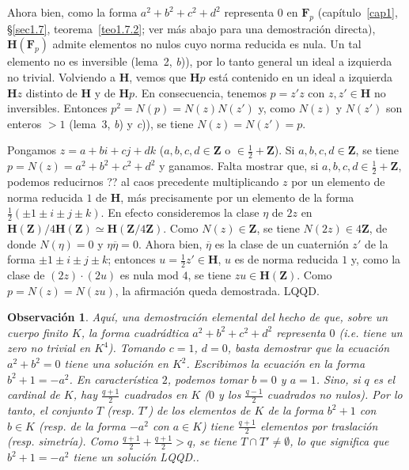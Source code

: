 \documentclass[bibtotoc,leqno,spanish]{amsbook}
\newcommand{\ZZ}{\mathbf{Z}}
\newcommand{\FF}{\mathbf{F}}
\newcommand{\HH}{\mathbf{H}}
\newcommand{\QED}{LQQD.}
\newcommand{\oline}[1]{\overline{#1}}
\numberwithin{equation}{section}
\theoremstyle{note}
\theoremstyle{note}
\theoremstyle{rem}
\newtheorem*{remark*}{Observaci\'on}
\numberwithin{theorem}{section}
\numberwithin{proposition}{section}
\numberwithin{definition}{section}
\numberwithin{lemma}{section}
\numberwithin{corollary}{section}
\numberwithin{example}{section}
\numberwithin{footnote}{section}%
\begin{document}
Ahora bien, como la forma $a^{2}+b^{2}+c^{2}+d^{2}$ representa $0$ en $\FF_{p}$ (cap\'itulo~\ref{cap1},
\S\ref{sec1.7}, teorema~\ref{teo1.7.2};
ver m\'as abajo para una demostraci\'on directa), $\HH(\FF_{p})$ admite elementos
no nulos cuyo norma reducida es nula. Un tal elemento no es inversible (lema~2, {\itshape b})), por lo
tanto general un ideal a izquierda no trivial. Volviendo a $\HH$, vemos que $\HH p$ est\'a
contenido en un ideal a izquierda $\HH z$ distinto de $\HH$ y de $\HH p$. En consecuencia, tenemos
$p = z'z$ con $z,z'\in\HH$ no inversibles. Entonces $p^{2}=N(p)=N(z)N(z')$ y, como
$N(z)$ y $N(z')$ son enteros $>1$ (lema~3, {\itshape b}) y {\itshape c})), se tiene $N(z) = N(z') = p$.

Pongamos $z = a+bi+cj+dk$ ($a,b,c,d\in\ZZ$ o $\in\frac{1}{2}+\ZZ$). Si $a,b,c,d\in\ZZ$, se tiene
$p = N(z) = a^{2}+b^{2}+c^{2}+d^{2}$ y ganamos. Falta mostrar que, si $a,b,c,d\in\frac{1}{2}+\ZZ$, podemos
reducirnos ?? al caos precedente multiplicando $z$ por un elemento de norma reducida $1$ de $\HH$, m\'as
precisamente por un elemento de la forma $\frac{1}{2}(\pm 1\pm i\pm j\pm k)$. En efecto consideremos
la clase $\eta$ de $2z$ en $\HH(\ZZ)/4\HH(\ZZ)\simeq\HH(\ZZ/4\ZZ)$. Como $N(z)\in\ZZ$, se tiene
$N(2z)\in 4\ZZ$, de donde $N(\eta) = 0$ y $\eta\oline\eta = 0$. Ahora bien, $\oline\eta$ es la clase
de un cuaterni\'on $z'$ de la forma $\pm 1\pm i\pm j\pm k$; entonces $u = \frac{1}{2}z'\in\HH$,
$u$ es de norma reducida $1$ y, como la clase de $(2z)\cdot(2u)$ es nula mod $4$, se tiene $zu\in\HH(\ZZ)$.
Como $p=N(z)=N(zu)$, la afirmaci\'on queda demostrada. \QED

\begin{remark*}
Aqu\'i, una demostraci\'on elemental del hecho de que, sobre un cuerpo finito $K$, la forma cuadr\'adtica
$a^{2}+b^{2}+c^{2}+d^{2}$ {\em representa} $0$ (i.e. tiene un zero no trivial en $K^{4}$). Tomando
$c=1$, $d=0$, basta demostrar que la ecuaci\'on $a^{2}+b^{2}=0$ tiene una soluci\'on en $K^{2}$. Escribimos
la ecuaci\'on en la forma $b^{2}+1=-a^{2}$. En caracter\'istica $2$, podemos tomar $b=0$ y $a=1$.
Sino, si $q$ es el cardinal de $K$, hay $\frac{q+1}{2}$ cuadrados en $K$
($0$ y los $\frac{q-1}{2}$ cuadrados no nulos). Por lo tanto, el conjunto $T$ (resp. $T'$) de los elementos
de $K$ de la forma $b^{2}+1$ con $b\in K$ (resp. de la forma $-a^{2}$ con $a\in K$) tiene
$\frac{q+1}{2}$ elementos por traslaci\'on (resp. simetr\'ia). Como $\frac{q+1}{2}+\frac{q+1}{2}>q$,
se tiene $T\cap T'\neq\emptyset$, lo que significa que $b^{2}+1=-a^{2}$ tiene un soluci\'on \QED.
\end{remark*}
\end{document}
